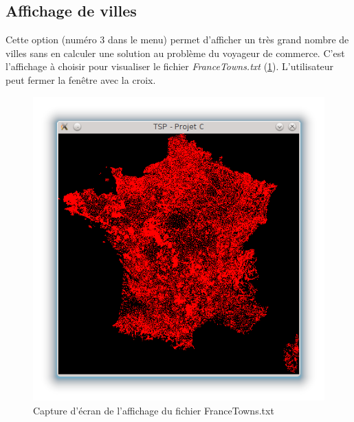 \documentclass[a4paper,11pt]{article}
\begin{document}
\subsection{Affichage de villes}
Cette option (numéro 3 dans le menu) permet d'afficher un très grand nombre de villes sans en calculer une solution au problème du voyageur de commerce. C'est l'affichage à choisir pour visualiser le fichier \textit{FranceTowns.txt} (\ref{fig1}). L'utilisateur peut fermer la fenêtre avec la croix.
\begin{center}
\begin{figure}[htbp]
\begin{center}
\includegraphics[scale=0.3]{france.png}
\caption{Capture d'écran de l'affichage du fichier FranceTowns.txt}
\label{fig1}
\end{center}
\end{figure}
\end{center}
\end{document}
